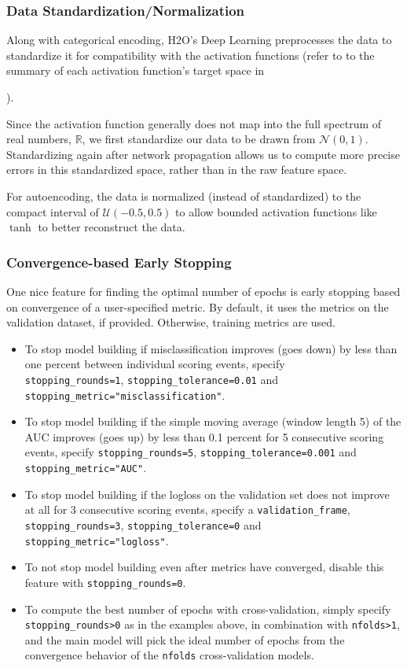 \subsubsection{Data Standardization/Normalization} 

Along with categorical encoding, H2O's Deep Learning preprocesses the data to standardize it for compatibility with the activation functions (refer to to the summary of each activation function's target space in {\textbf{}). 

Since the activation function generally does not  map into the full spectrum of real numbers, $\mathbb{R}$, we first standardize our data to be drawn from $\mathcal{N}(0,1)$. Standardizing again after network propagation allows us to compute more precise errors in this standardized space, rather than in the raw feature space. 

For autoencoding, the data is normalized (instead of standardized) to the compact interval of $\mathcal{U}(-0.5,0.5)$ to allow bounded activation functions like $\tanh$ to better reconstruct the data.

\subsubsection{Convergence-based Early Stopping}
One nice feature for finding the optimal number of epochs is early stopping based on convergence of a user-specified metric. By default, it uses the metrics on the validation dataset, if provided. Otherwise, training metrics are used.

\begin{itemize}
\item To stop model building if misclassification improves (goes down) by less than one percent between individual scoring events, specify \\\texttt{stopping\_rounds=1}, \texttt{stopping\_tolerance=0.01} and \\\texttt{stopping\_metric="misclassification"}.
\item To stop model building if the simple moving average (window length 5) of the AUC improves (goes up) by less than 0.1 percent for 5 consecutive scoring events, specify \texttt{stopping\_rounds=5}, \texttt{stopping\_tolerance=0.001} and \texttt{stopping\_metric="AUC"}.
\item To stop model building if the logloss on the validation set does not improve at all for 3 consecutive scoring events, specify a \texttt{validation\_frame}, \texttt{stopping\_rounds=3}, \texttt{stopping\_tolerance=0} and \\\texttt{stopping\_metric="logloss"}.
\item To not stop model building even after metrics have converged, disable this feature with \texttt{stopping\_rounds=0}.
\item To compute the best number of epochs with cross-validation, simply specify \texttt{stopping\_rounds>0} as in the examples above, in combination with \texttt{nfolds>1}, and the main model will pick the ideal number of epochs from the convergence behavior of the \texttt{nfolds} cross-validation models.
\end{itemize}

}
